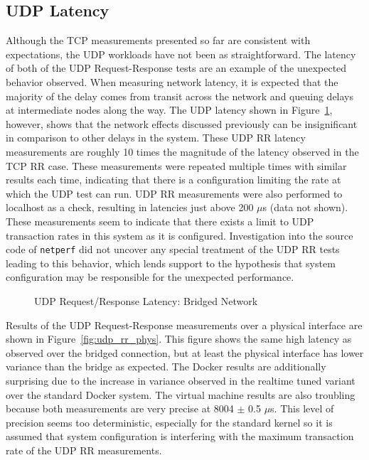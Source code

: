 
\subsection{UDP Latency} %
\label{sub:udplatency}

Although the TCP measurements presented so far are consistent with expectations, the UDP workloads have not been as straightforward.
The latency of both of the UDP Request-Response tests are an example of the unexpected behavior observed.
When measuring network latency, it is expected that the majority of the delay comes from transit across the network and queuing delays at intermediate nodes along the way.  
The UDP latency shown in Figure~\ref{fig:udp_rr_bridge}, however, shows that the network effects discussed previously can be insignificant in comparison to other delays in the system.
These UDP RR latency measurements are roughly 10 times the magnitude of the latency observed in the TCP RR case.
These measurements were repeated multiple times with similar results each time, indicating that there is a configuration limiting the rate at which the UDP test can run.
UDP RR measurements were also performed to localhost as a check, resulting in latencies just above 200 $\mu$s (data not shown).  
These measurements seem to indicate that there exists a limit to UDP transaction rates in this system as it is configured.  
Investigation into the source code of \texttt{netperf} did not uncover any special treatment of the UDP RR tests leading to this behavior, which lends support to the hypothesis that system configuration may be responsible for the unexpected performance.

\begin{figure}
    \centering
    \def\svgwidth{\columnwidth}
    
    \caption{UDP Request/Response Latency: Bridged Network}
    \label{fig:udp_rr_bridge}
\end{figure}

Results of the UDP Request-Response measurements over a physical interface are shown in Figure~\ref{fig:udp_rr_phys}.  
This figure shows the same high latency as observed over the bridged connection, but at least the physical interface has lower variance than the bridge as expected.
The Docker results are additionally surprising due to the increase in variance observed in the realtime tuned variant over the standard Docker system.
The virtual machine results are also troubling because both measurements are very precise at 8004 $\pm$ 0.5 $\mu$s.  
This level of precision seems too deterministic, especially for the standard kernel so it is assumed that system configuration is interfering with the maximum transaction rate of the UDP RR measurements.

